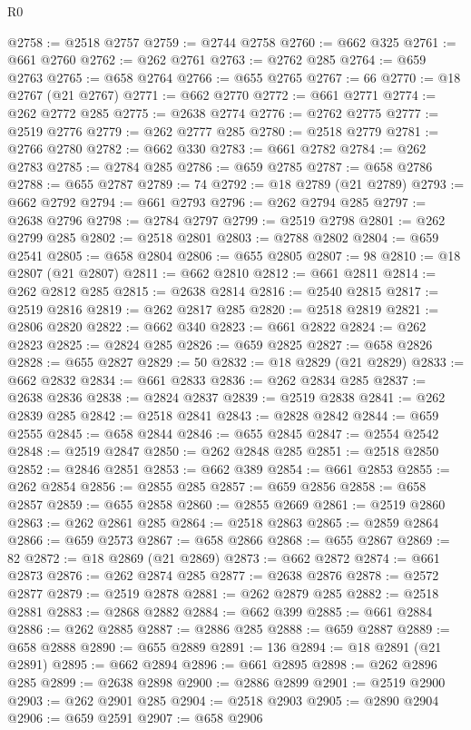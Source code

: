 \begin{lexlean}{R0}
\begin{coremodule}
@2758 := @2518 @2757
@2759 := @2744 @2758
@2760 := @662 @325
@2761 := @661 @2760
@2762 := @262 @2761
@2763 := @2762 @285
@2764 := @659 @2763
@2765 := @658 @2764
@2766 := @655 @2765
@2767 := 66
@2770 := @18 @2767 (@21 @2767)
@2771 := @662 @2770
@2772 := @661 @2771
@2774 := @262 @2772 @285
@2775 := @2638 @2774
@2776 := @2762 @2775
@2777 := @2519 @2776
@2779 := @262 @2777 @285
@2780 := @2518 @2779
@2781 := @2766 @2780
@2782 := @662 @330
@2783 := @661 @2782
@2784 := @262 @2783
@2785 := @2784 @285
@2786 := @659 @2785
@2787 := @658 @2786
@2788 := @655 @2787
@2789 := 74
@2792 := @18 @2789 (@21 @2789)
@2793 := @662 @2792
@2794 := @661 @2793
@2796 := @262 @2794 @285
@2797 := @2638 @2796
@2798 := @2784 @2797
@2799 := @2519 @2798
@2801 := @262 @2799 @285
@2802 := @2518 @2801
@2803 := @2788 @2802
@2804 := @659 @2541
@2805 := @658 @2804
@2806 := @655 @2805
@2807 := 98
@2810 := @18 @2807 (@21 @2807)
@2811 := @662 @2810
@2812 := @661 @2811
@2814 := @262 @2812 @285
@2815 := @2638 @2814
@2816 := @2540 @2815
@2817 := @2519 @2816
@2819 := @262 @2817 @285
@2820 := @2518 @2819
@2821 := @2806 @2820
@2822 := @662 @340
@2823 := @661 @2822
@2824 := @262 @2823
@2825 := @2824 @285
@2826 := @659 @2825
@2827 := @658 @2826
@2828 := @655 @2827
@2829 := 50
@2832 := @18 @2829 (@21 @2829)
@2833 := @662 @2832
@2834 := @661 @2833
@2836 := @262 @2834 @285
@2837 := @2638 @2836
@2838 := @2824 @2837
@2839 := @2519 @2838
@2841 := @262 @2839 @285
@2842 := @2518 @2841
@2843 := @2828 @2842
@2844 := @659 @2555
@2845 := @658 @2844
@2846 := @655 @2845
@2847 := @2554 @2542
@2848 := @2519 @2847
@2850 := @262 @2848 @285
@2851 := @2518 @2850
@2852 := @2846 @2851
@2853 := @662 @389
@2854 := @661 @2853
@2855 := @262 @2854
@2856 := @2855 @285
@2857 := @659 @2856
@2858 := @658 @2857
@2859 := @655 @2858
@2860 := @2855 @2669
@2861 := @2519 @2860
@2863 := @262 @2861 @285
@2864 := @2518 @2863
@2865 := @2859 @2864
@2866 := @659 @2573
@2867 := @658 @2866
@2868 := @655 @2867
@2869 := 82
@2872 := @18 @2869 (@21 @2869)
@2873 := @662 @2872
@2874 := @661 @2873
@2876 := @262 @2874 @285
@2877 := @2638 @2876
@2878 := @2572 @2877
@2879 := @2519 @2878
@2881 := @262 @2879 @285
@2882 := @2518 @2881
@2883 := @2868 @2882
@2884 := @662 @399
@2885 := @661 @2884
@2886 := @262 @2885
@2887 := @2886 @285
@2888 := @659 @2887
@2889 := @658 @2888
@2890 := @655 @2889
@2891 := 136
@2894 := @18 @2891 (@21 @2891)
@2895 := @662 @2894
@2896 := @661 @2895
@2898 := @262 @2896 @285
@2899 := @2638 @2898
@2900 := @2886 @2899
@2901 := @2519 @2900
@2903 := @262 @2901 @285
@2904 := @2518 @2903
@2905 := @2890 @2904
@2906 := @659 @2591
@2907 := @658 @2906

\end{coremodule}
\end{lexlean}

